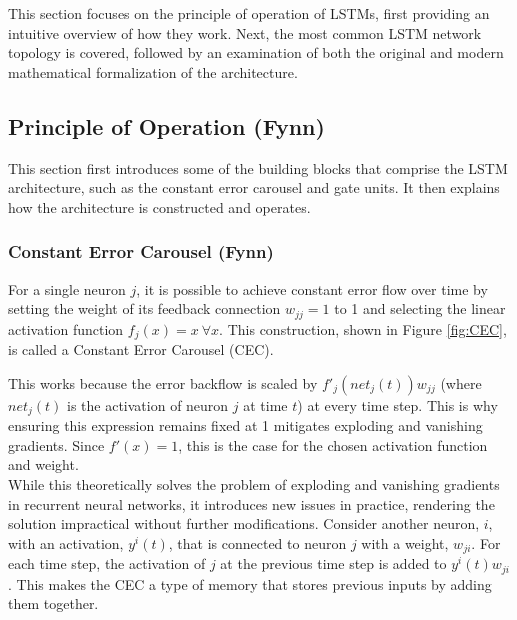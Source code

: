 \documentclass[twoside,a4paper,10pt,DIV=12,BCOR=12mm]{scrartcl}
\begin{document}
This section focuses on the principle of operation of LSTMs, first providing an intuitive overview of how they work. Next, the most common LSTM network topology is covered, followed by an examination of both the original and modern mathematical formalization of the architecture.

\subsection{Principle of Operation (Fynn)}
This section first introduces some of the building blocks that comprise the LSTM architecture, such as the constant error carousel and gate units. It then explains how the architecture is constructed and operates.

\subsubsection{Constant Error Carousel (Fynn)}
For a single neuron $j$, it is possible to achieve constant error flow over time by setting the weight of its feedback connection $w_{jj}=1$ to 1 and selecting the linear activation function $f_j(x)=x\ \forall x$. This construction, shown in Figure \ref{fig:CEC}, is called a Constant Error Carousel (CEC).\cite{hochreiter1997lstm}
\begin{center}
\label{fig:CEC}
\end{center}
This works because the error backflow is scaled by  $f'_j(net_j(t))w_{jj}$ (where $net_j(t)$ is the activation of neuron $j$ at time $t$) at every time step. This is why ensuring this expression remains fixed at 1 mitigates exploding and vanishing gradients. Since $f'(x)=1$, this is the case for the chosen activation function and weight.\cite{hochreiter1997lstm} \\
While this theoretically solves the problem of exploding and vanishing gradients in recurrent neural networks, it introduces new issues in practice, rendering the solution impractical without further modifications. Consider another neuron, $i$, with an activation, $y^i(t)$, that is connected to neuron $j$ with a weight, $w_{ji}.$  For each time step, the activation of $j$ at the previous time step is added to $y^i(t)w_{ji}$. This makes the CEC a type of memory that stores previous inputs by adding them together.\cite{hochreiter1997lstm} \\
\end{document}
